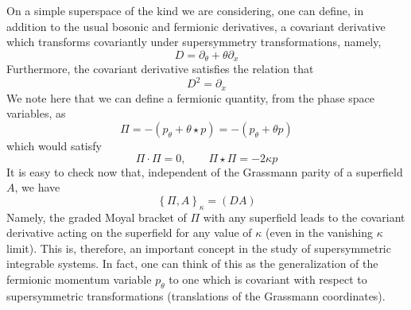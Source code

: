 \documentclass[a4paper,11pt]{article}
\begin{document}
On a simple superspace of the kind we are considering, one can define,
in addition to the usual bosonic and fermionic derivatives, a covariant
derivative which transforms covariantly under supersymmetry
transformations, namely,
\begin{equation}
D = \partial_{\theta} + \theta \partial_{x}\label{5}
\end{equation}
Furthermore, the covariant derivative satisfies the relation that
\begin{equation}
D^{2} = \partial_{x}
\end{equation} 
We note here that we can define a fermionic quantity, from the phase
space variables, as
\begin{equation}
\Pi = -\left(p_{\theta}+\theta\star p\right) = - \left(p_{\theta} +
\theta p\right)\label{6}
\end{equation}
which would satisfy
\begin{equation}
\Pi\cdot\Pi = 0,\qquad \Pi\star \Pi = - 2\kappa p\label{7}
\end{equation}
It is easy to check now that, independent of the Grassmann parity of a
superfield $A$, we have
\begin{equation}
\left\{\Pi,A\right\}_{\kappa} =  (DA)
\end{equation}
Namely, the graded Moyal bracket of $\Pi$ with any superfield leads to
the covariant derivative acting on the superfield for any value of
$\kappa$  (even in the
vanishing $\kappa$ limit). This is, therefore, an important concept in
the study of supersymmetric integrable systems. In fact, one can think
of this as the generalization of the fermionic momentum variable
$p_{\theta}$ to one which is covariant with respect to supersymmetric
transformations (translations of the Grassmann coordinates).
\end{document}
